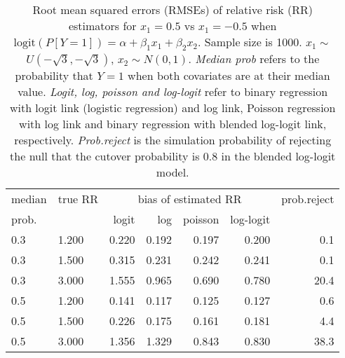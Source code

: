 \documentclass[12pt,a4paper]{article}
\begin{document}
\begin{table}[H] 
\small\sf\centering 
\caption{Root mean squared errors (RMSEs) of relative risk (RR) estimators for $x_1=0.5$ vs $x_1=-0.5$ when $\mbox{logit}(P[Y=1])=\alpha+\beta_1 x_1 + \beta_2 x_2$. Sample size is 1000. $x_1 \sim $$U(-\sqrt{3},-\sqrt{3})$, $x_2 \sim N(0,1)$. {\it Median prob} refers to the probability that $Y=1$ when both covariates are at their median value. {\it Logit, log, poisson and log-logit} refer to binary regression with logit link (logistic regression) and log link, Poisson regression with log link and binary regression with blended log-logit link, respectively. {\it Prob.reject} is the simulation probability of rejecting the null that the cutover probability is $0.8$ in the blended log-logit model.} 
\begin{tabular}{llrrrrr} 
\toprule 
median & true RR & \multicolumn{4}{c}{bias of estimated RR} & prob.reject \\ 
prob. & & logit & log & poisson & log-logit  & \\ \midrule 
0.3 & 1.200 & 0.220 & 0.192 & 0.197 & 0.200 &  0.1 \\  
0.3 & 1.500 & 0.315 & 0.231 & 0.242 & 0.241 &  0.1 \\  
0.3 & 3.000 & 1.555 & 0.965 & 0.690 & 0.780 & 20.4 \\  
0.5 & 1.200 & 0.141 & 0.117 & 0.125 & 0.127 &  0.6 \\  
0.5 & 1.500 & 0.226 & 0.175 & 0.161 & 0.181 &  4.4 \\  
0.5 & 3.000 & 1.356 & 1.329 & 0.843 & 0.830 & 38.3 \\  
\bottomrule 
\end{tabular} 
\end{table} 
\end{document}
